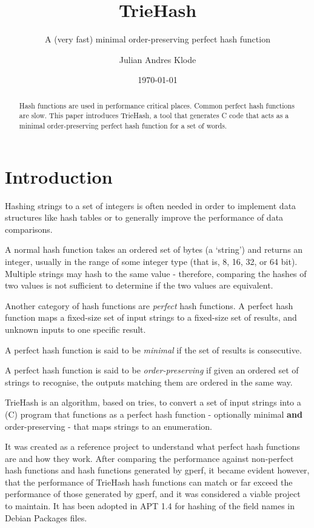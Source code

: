 \documentclass[parskip=half]{scrartcl}
\author{Julian Andres Klode}
\title{TrieHash}
\subtitle{A (very fast) minimal order-preserving perfect hash function}
\date{\today}
\begin{document}
    \maketitle{}
    \begin{abstract}
        Hash functions are used in performance critical places. Common perfect
        hash functions are slow. This paper introduces TrieHash, a tool that generates
        C code that acts as a minimal order-preserving perfect hash function
        for a set of words.
    \end{abstract}
    \section{Introduction}
    Hashing strings to a set of integers is often needed in order to implement
    data structures like hash tables or to generally improve the performance of
    data comparisons.

    A normal hash function takes an ordered set of bytes (a `string') and returns an
    integer, usually in the range of some integer type (that is, 8, 16, 32,
    or 64 bit). Multiple strings may hash to the same value - therefore,
    comparing the hashes of two values is not sufficient to determine if the
    two values are equivalent.

    Another category of hash functions are \textit{perfect} hash functions.
    A perfect hash function maps a fixed-size set of input strings to a
    fixed-size set of results, and unknown inputs to one specific result.

    A perfect hash function is said to be \textit{minimal} if the set of
    results is consecutive.

    A perfect hash function is said to be \textit{order-preserving}
    if given an ordered set of strings to recognise, the outputs matching them
    are ordered in the same way.

    TrieHash is an algorithm, based on tries, to convert a set of input strings
    into a (C) program that functions as a perfect hash function - optionally minimal \textbf{and}
    order-preserving - that maps strings to an enumeration.

    It was created as a reference project to understand what perfect hash
    functions are and how they work. After comparing the performance against
    non-perfect hash functions and hash functions generated by gperf, it
    became evident however, that the performance of TrieHash hash functions
    can match or far exceed the performance of those generated by gperf, and it was considered
    a viable project to maintain. It has been adopted in APT 1.4 for hashing
    of the field names in Debian Packages files.
    
\end{document}
